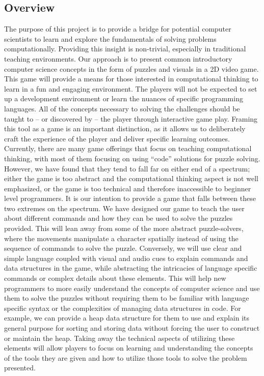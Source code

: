 \subsection{Overview}
The purpose of this project is to provide a bridge for potential computer scientists to learn and explore the fundamentals of solving problems computationally. Providing this insight is non-trivial, especially in traditional teaching environments. Our approach is to present common introductory computer science concepts in the form of puzzles and visuals in a 2D video game. This game will provide a means for those interested in computational thinking to learn in a fun and engaging environment. The players will not be expected to set up a development environment or learn the nuances of specific programming languages. All of the concepts necessary to solving the challenges should be taught to -- or discovered by -- the player through interactive game play. Framing this tool as a game is an important distinction, as it allows us to deliberately craft the experience of the player and deliver specific learning outcomes.\\

Currently, there are many game offerings that focus on teaching computational thinking, with most of them focusing on using “code” solutions for puzzle solving. However, we have found that they tend to fall far on either end of a spectrum; either the game is too abstract and the computational thinking aspect is not well emphasized, or the game is too technical and therefore inaccessible to beginner level programmers. It is our intention to provide a game that falls between these two extremes on the spectrum. We have designed our game to teach the user about different commands and how they can be used to solve the puzzles provided. This will lean away from some of the more abstract puzzle-solvers, where the movements manipulate a character spatially instead of using the sequence of commands to solve the puzzle. Conversely, we will use clear and simple language coupled with visual and audio cues to explain commands and data structures in the game, while abstracting the intricacies of language specific commands or complex details about these elements. This will help new programmers to more easily understand the concepts of computer science and use them to solve the puzzles without requiring them to be familiar with language specific syntax or the complexities of managing data structures in code. For example, we can provide a heap data structure for them to use and explain its general purpose for sorting and storing data without forcing the user to construct or maintain the heap. Taking away the technical aspects of utilizing these elements will allow players to focus on learning and understanding the concepts of the tools they are given and how to utilize those tools to solve the problem presented.\\

